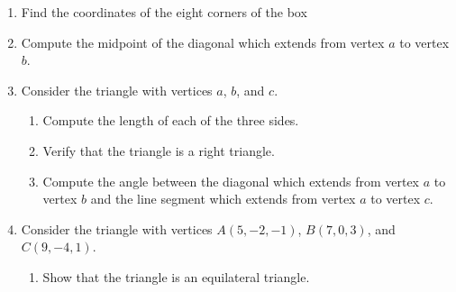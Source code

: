 \documentclass[12pt]{article}
\newif\ifans
\begin{document}
\begin{enumerate}

\item Find the coordinates of the eight corners of the box

\ifans{\fbox{$(1,2,0), (3,2,0), (3,5,0), (1,5,0), (1,2,1), (3,2,1), (3,5,1), (1,5,1)$}} \fi

\item Compute the midpoint of the diagonal which extends from vertex $a$ to vertex $b$.

\ifans{\fbox{$\left(2,\frac{7}{2},\frac{1}{2}\right)$}} \fi

\item Consider the triangle with vertices $a$, $b$, and $c$.

\begin{enumerate}

\item Compute the length of each of the three sides.

\ifans{\fbox{\parbox{0.8\linewidth}{The diagonal from vertex $a$ to vertex $b$ has length $\sqrt{14}$;\\
The line segment from vertex $a$ to vertex $c$ has length $\sqrt{13}$;\\
The line segment from vertex $c$ to vertex $b$ has length 1.}}} \fi

\item Verify that the triangle is a right triangle.

\ifans{\fbox{\parbox{1\linewidth}{Notice that $\left(\sqrt{13}\right)^2+1^2=\left(\sqrt{14}\right)^2$.  So, the sides of the triangle (which are not colinear) satisfy Pythagorean's Theorem.  Thus, the triangle is a right triangle.}}} \fi

\item Compute the angle between the diagonal which extends from vertex $a$ to vertex $b$ and the line segment which extends from vertex $a$ to vertex $c$.

\ifans{\fbox{$\cos^{-1}\left(\frac{\sqrt{13}}{\sqrt{14}}\right)$}} \fi

\end{enumerate}

\item Consider the triangle with vertices $A(5,-2,-1)$, $B(7,0,3)$, and $C(9,-4,1)$.

\begin{enumerate}

\item Show that the triangle is an equilateral triangle.


\end{enumerate}
\end{enumerate}
\end{document}
